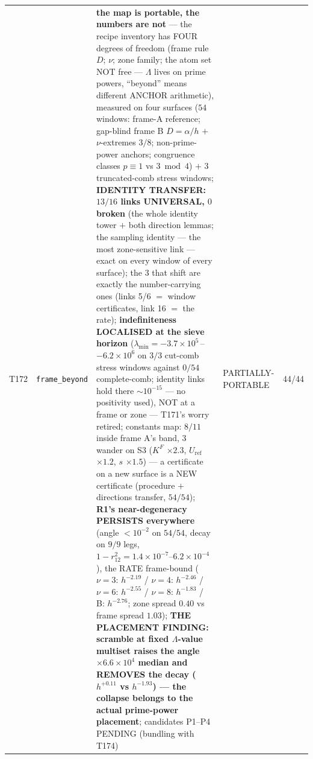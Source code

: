 \documentclass[11pt,a4paper]{article}
\begin{document}
{\begin{xltabular}{\linewidth}{@{}p{0.95cm} >{\raggedright\arraybackslash}p{3.1cm} Y >{\raggedright\scriptsize\arraybackslash}p{3.35cm} p{1.15cm}@{}}
T172 & \texttt{\scriptsize frame\_\allowbreak beyond} & \textbf{the map is portable, the numbers are not} --- the recipe inventory has FOUR degrees of freedom (frame rule $D$; $\nu$; zone family; the atom set NOT free --- $\Lambda$ lives on prime powers, ``beyond'' means different ANCHOR arithmetic), measured on four surfaces ($54$ windows: frame-A reference; gap-blind frame B $D=\alpha/h$ $+$ $\nu$-extremes $3/8$; non-prime-power anchors; congruence classes $p\equiv1$ vs $3\bmod4$) $+$ $3$ truncated-comb stress windows; \textbf{IDENTITY TRANSFER: $13/16$ links UNIVERSAL, $0$ broken} (the whole identity tower $+$ both direction lemmas; the sampling identity --- the most zone-sensitive link --- exact on every window of every surface); the $3$ that shift are exactly the number-carrying ones (links 5/6 $=$ window certificates, link 16 $=$ the rate); \textbf{indefiniteness LOCALISED at the sieve horizon} ($\lambda_{\min}=-3.7\times10^{5}$\,--\,$-6.2\times10^{6}$ on $3/3$ cut-comb stress windows against $0/54$ complete-comb; identity links hold there ${\sim}10^{-15}$ --- no positivity used), NOT at a frame or zone --- T171's worry retired; constants map: $8/11$ inside frame A's band, $3$ wander on S3 ($K^F$ $\times2.3$, $U_{\mathrm{ref}}$ $\times1.2$, $s$ $\times1.5$) --- a certificate on a new surface is a NEW certificate (procedure $+$ directions transfer, $54/54$); \textbf{R1's near-degeneracy PERSISTS everywhere} (angle $<10^{-2}$ on $54/54$, decay on $9/9$ legs, $1-r_{12}^2=1.4\times10^{-7}$--$6.2\times10^{-4}$), the RATE frame-bound ($\nu=3$: $h^{-2.19}$ / $\nu=4$: $h^{-2.46}$ / $\nu=6$: $h^{-2.55}$ / $\nu=8$: $h^{-1.83}$ / B: $h^{-2.76}$; zone spread $0.40$ vs frame spread $1.03$); \textbf{THE PLACEMENT FINDING: scramble at fixed $\Lambda$-value multiset raises the angle $\times6.6\times10^{4}$ median and REMOVES the decay ($h^{+0.11}$ vs $h^{-1.93}$) --- the collapse belongs to the actual prime-power placement}; candidates P1--P4 PENDING (bundling with T174) & PARTIALLY-PORTABLE & 44/44\\

\end{xltabular}}
\end{document}
